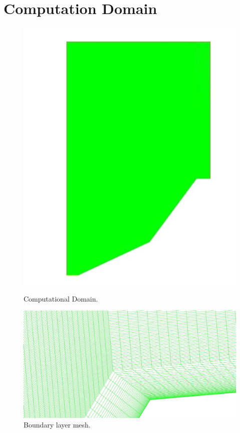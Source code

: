 \section{Computation Domain}
\begin{figure}[ht]
\centering
\begin{minipage}{.5\textwidth}
  \centering
  \includegraphics[width=0.9\linewidth]{images/mesh.jpg}
  \caption{ Computational Domain.}
  \label{fig:Mesh}
\end{minipage}%
\begin{minipage}{.5\textwidth}
  \centering
 \includegraphics[width =0.9\linewidth]{images/boundary_layer.jpg}
  \caption{ Boundary layer mesh.}
  \label{fig:Boundarylayermesh.}
\end{minipage}
\end{figure}
